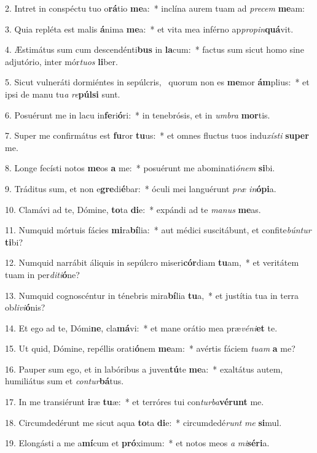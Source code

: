 2. Intret in conspéctu tuo o\textbf{rá}tio \textbf{me}a:~*  inclína aurem tuam ad \textit{pre}\textit{cem} \textbf{me}am:\

3. Quia repléta est malis \textbf{á}nima \textbf{me}a:~*  et vita mea inférno ap\textit{pro}\textit{pin}\textbf{quá}vit.\

4. Æstimátus sum cum descendénti\textbf{bus} in \textbf{la}cum:~*  factus sum sicut homo sine adjutório, inter mór\textit{tu}\textit{os} \textbf{li}ber.\

5. Sicut vulneráti dormiéntes in sepúlcris, \dag\  quorum non es \textbf{me}mor \textbf{ám}plius:~*  et ipsi de manu tu\textit{a} \textit{re}\textbf{púl}\textbf{si} sunt.\

6. Posuérunt me in lacu in\textbf{fe}ri\textbf{ó}ri:~*  in tenebrósis, et in \textit{um}\textit{bra} \textbf{mor}tis.\

7. Super me confirmátus est \textbf{fu}ror \textbf{tu}us:~*  et omnes fluctus tuos indu\textit{xís}\textit{ti} \textbf{su}\textbf{per} me.\

8. Longe fecísti notos \textbf{me}os \textbf{a} me:~*  posuérunt me abominati\textit{ó}\textit{nem} \textbf{si}bi.\

9. Tráditus sum, et non e\textbf{gre}di\textbf{é}bar:~*  óculi mei languérunt \textit{præ} \textit{in}\textbf{ó}\textbf{pi}a.\

10. Clamávi ad te, Dómine, \textbf{to}ta \textbf{di}e:~*  expándi ad te \textit{ma}\textit{nus} \textbf{me}as.\

11. Numquid mórtuis fácies \textbf{mi}ra\textbf{bí}lia:~*  aut médici suscitábunt, et confite\textit{bún}\textit{tur} \textbf{ti}bi?\

12. Numquid narrábit áliquis in sepúlcro miseri\textbf{cór}diam \textbf{tu}am,~*  et veritátem tuam in per\textit{di}\textit{ti}\textbf{ó}ne?\

13. Numquid cognoscéntur in ténebris mira\textbf{bí}lia \textbf{tu}a,~*  et justítia tua in terra ob\textit{li}\textit{vi}\textbf{ó}nis?\

14. Et ego ad te, Dómi\textbf{ne}, cla\textbf{má}vi:~*  et mane orátio mea præ\textit{vé}\textit{ni}\textbf{et} te.\

15. Ut quid, Dómine, repéllis orati\textbf{ó}nem \textbf{me}am:~*  avértis fáciem \textit{tu}\textit{am} \textbf{a} me?\

16. Pauper sum ego, et in labóribus a juven\textbf{tú}te \textbf{me}a:~*  exaltátus autem, humiliátus sum et \textit{con}\textit{tur}\textbf{bá}tus.\

17. In me transiérunt \textbf{i}ræ \textbf{tu}æ:~*  et terróres tui con\textit{tur}\textit{ba}\textbf{vé}\textbf{runt} me.\

18. Circumdedérunt me sicut aqua \textbf{to}ta \textbf{di}e:~*  circumdedé\textit{runt} \textit{me} \textbf{si}mul.\

19. Elongásti a me a\textbf{mí}cum et \textbf{pró}ximum:~*  et notos meos \textit{a} \textit{mi}\textbf{sé}\textbf{ri}a.\

